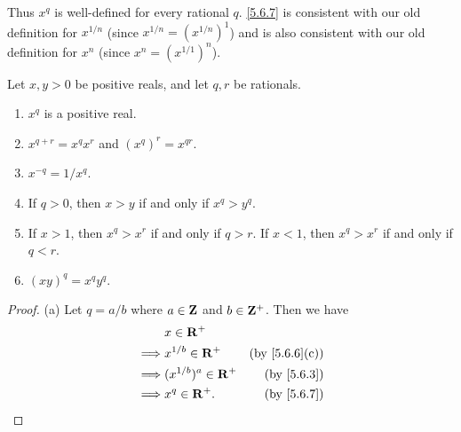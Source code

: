 \begin{note}
  Thus \(x^q\) is well-defined for every rational \(q\).
  \cref{5.6.7} is consistent with our old definition for \(x^{1 / n}\) (since \(x^{1 / n} = (x^{1 / n})^1\)) and is also consistent with our old definition for \(x^n\) (since \(x^n = (x^{1 / 1})^n\)).
\end{note}

\begin{lemma}\label{5.6.9}
  Let \(x, y > 0\) be positive reals, and let \(q, r\) be rationals.
  \begin{enumerate}
    \item \(x^q\) is a positive real.
    \item \(x^{q + r} = x^q x^r\) and \((x^q)^r = x^{qr}\).
    \item \(x^{-q} = 1 / x^q\).
    \item If \(q > 0\), then \(x > y\) if and only if \(x^q > y^q\).
    \item If \(x > 1\), then \(x^q > x^r\) if and only if \(q > r\).
          If \(x < 1\), then \(x^q > x^r\) if and only if \(q < r\).
    \item \((xy)^q = x^q y^q\).
  \end{enumerate}
\end{lemma}

\begin{proof}{(a)}
  Let \(q = a / b\) where \(a \in \mathbf{Z}\) and \(b \in \mathbf{Z}^+\).
  Then we have
  \begin{align*}
             & x \in \R^+                                           \\
    \implies & x^{1 / b} \in \R^+     & \text{(by \cref{5.6.6}(c))} \\
    \implies & (x^{1 / b})^a \in \R^+ & \text{(by \cref{5.6.3})}    \\
    \implies & x^q \in \R^+.          & \text{(by \cref{5.6.7})}
  \end{align*}
\end{proof}

